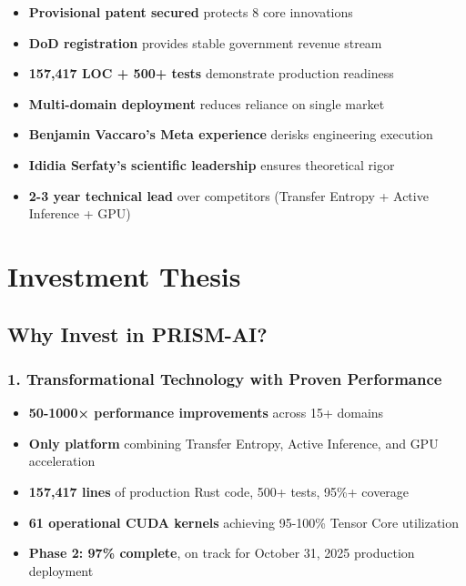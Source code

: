\documentclass[11pt,letterpaper]{article}
\begin{document}
\begin{tcolorbox}[colback=lightgray,colframe=successgreen,title=Key Risk Mitigations]
\begin{itemize}[leftmargin=*]
    \item \textbf{Provisional patent secured} protects 8 core innovations
    \item \textbf{DoD registration} provides stable government revenue stream
    \item \textbf{157,417 LOC + 500+ tests} demonstrate production readiness
    \item \textbf{Multi-domain deployment} reduces reliance on single market
    \item \textbf{Benjamin Vaccaro's Meta experience} derisks engineering execution
    \item \textbf{Ididia Serfaty's scientific leadership} ensures theoretical rigor
    \item \textbf{2-3 year technical lead} over competitors (Transfer Entropy + Active Inference + GPU)
\end{itemize}
\end{tcolorbox}

\newpage

\section{Investment Thesis}

\subsection{Why Invest in PRISM-AI?}

\subsubsection{1. Transformational Technology with Proven Performance}

\begin{itemize}
    \item \textbf{50-1000× performance improvements} across 15+ domains
    \item \textbf{Only platform} combining Transfer Entropy, Active Inference, and GPU acceleration
    \item \textbf{157,417 lines} of production Rust code, 500+ tests, 95\%+ coverage
    \item \textbf{61 operational CUDA kernels} achieving 95-100\% Tensor Core utilization
    \item \textbf{Phase 2: 97\% complete}, on track for October 31, 2025 production deployment
\end{itemize}
\end{document}
